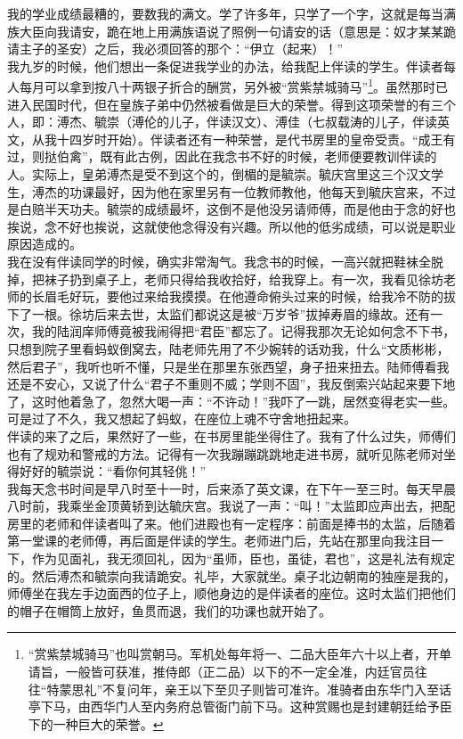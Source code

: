 我的学业成绩最糟的，要数我的满文。学了许多年，只学了一个字，这就是每当满族大臣向我请安，跪在地上用满族语说了照例一句请安的话（意思是：奴才某某跪请主子的圣安）之后，我必须回答的那个：“伊立（起来）！”\\

我九岁的时候，他们想出一条促进我学业的办法，给我配上伴读的学生。伴读者每人每月可以拿到按八十两银子折合的酬赏，另外被“赏紫禁城骑马”\footnote{“赏紫禁城骑马”也叫赏朝马。军机处每年将一、二品大臣年六十以上者，开单请旨，一般皆可获准，推侍郎（正二品）以下的不一定全准，内廷官员往往“特蒙思礼”不复问年，亲王以下至贝子则皆可准许。准骑者由东华门入至话亭下马，由西华门人至内务府总管衙门前下马。这种赏赐也是封建朝廷给予臣下的一种巨大的荣誉。}。虽然那时已进入民国时代，但在皇族子弟中仍然被看做是巨大的荣誉。得到这项荣誉的有三个人，即：溥杰、毓崇（溥伦的儿子，伴读汉文）、溥佳（七叔载涛的儿子，伴读英文，从我十四岁时开始）。伴读者还有一种荣誉，是代书房里的皇帝受责。“成王有过，则挞伯禽”，既有此古例，因此在我念书不好的时候，老师便要教训伴读的人。实际上，皇弟溥杰是受不到这个的，倒楣的是毓崇。毓庆宫里这三个汉文学生，溥杰的功课最好，因为他在家里另有一位教师教他，他每天到毓庆宫来，不过是白赔半天功夫。毓崇的成绩最坏，这倒不是他没另请师傅，而是他由于念的好也挨说，念不好也挨说，这就使他念得没有兴趣。所以他的低劣成绩，可以说是职业原因造成的。\\

我在没有伴读同学的时候，确实非常淘气。我念书的时候，一高兴就把鞋袜全脱掉，把袜子扔到桌子上，老师只得给我收拾好，给我穿上。有一次，我看见徐坊老师的长眉毛好玩，要他过来给我摸摸。在他遵命俯头过来的时候，给我冷不防的拔下了一根。徐坊后来去世，太监们都说这是被“万岁爷”拔掉寿眉的缘故。还有一次，我的陆润庠师傅竟被我闹得把“君臣”都忘了。记得我那次无论如何念不下书，只想到院子里看蚂蚁倒窝去，陆老师先用了不少婉转的话劝我，什么“文质彬彬，然后君子”，我听也听不懂，只是坐在那里东张西望，身子扭来扭去。陆师傅看我还是不安心，又说了什么“君子不重则不威；学则不固”，我反倒索兴站起来要下地了，这时他着急了，忽然大喝一声：“不许动！”我吓了一跳，居然变得老实一些。可是过了不久，我又想起了蚂蚁，在座位上魂不守舍地扭起来。\\

伴读的来了之后，果然好了一些，在书房里能坐得住了。我有了什么过失，师傅们也有了规劝和警戒的方法。记得有一次我蹦蹦跳跳地走进书房，就听见陈老师对坐得好好的毓崇说：“看你何其轻佻！”\\

我每天念书时间是早八时至十一时，后来添了英文课，在下午一至三时。每天早晨八时前，我乘坐金顶黄轿到达毓庆宫。我说了一声：“叫！”太监即应声出去，把配房里的老师和伴读者叫了来。他们进殿也有一定程序：前面是捧书的太监，后随着第一堂课的老师傅，再后面是伴读的学生。老师进门后，先站在那里向我注目一下，作为见面礼，我无须回礼，因为“虽师，臣也，虽徒，君也”，这是礼法有规定的。然后溥杰和毓崇向我请跪安。礼毕，大家就坐。桌子北边朝南的独座是我的，师傅坐在我左手边面西的位子上，顺他身边的是伴读者的座位。这时太监们把他们的帽子在帽筒上放好，鱼贯而退，我们的功课也就开始了。\\

